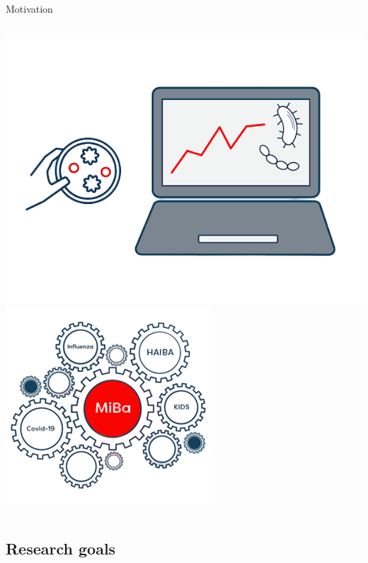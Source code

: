 \documentclass[aspectratio=169,handout]{beamer}
\begin{document}
\begin{frame}{Motivation}
\begin{columns}
\begin{column}{.38\textwidth}
\includegraphics[width=0.75\linewidth]{../../figures/MiBaPetriComp} \includegraphics[width=0.75\linewidth]{../../figures/MiBa} 

 \normalsize
\end{column}
\end{columns}
\end{frame}

\hypertarget{research-goals}{%
\subsection{Research goals}\label{research-goals}}
\end{document}

